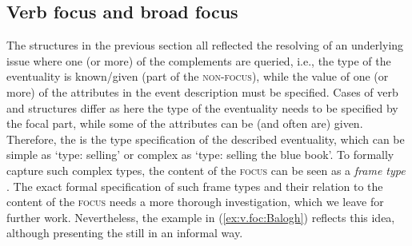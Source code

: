 \documentclass[output=paper,colorlinks,citecolor=brown]{langscibook}
\begin{document}
\subsection{Verb focus and broad focus }\label{sec:broad.foc:Balogh}

The  structures in the previous section all reflected the resolving of an underlying issue where one (or more) of the complements are queried, i.e., the type of the eventuality is known/given (part of the {\textsc{non-focus}}), while the value of one (or more) of the attributes in the event description must be specified. Cases of verb  and  structures differ as here the type of the eventuality needs to be specified by the focal part, while some of the attributes can be (and often are) given. Therefore, the  is the type specification of the described eventuality, which can be simple as `type: selling' or complex as `type: selling the blue book'. To formally capture such complex types, the content of the {\textsc{focus}} can be seen as a \textit{frame type} \citep[introduced by][]{balogh:osswald:20}. The exact formal specification of such frame types and their relation to the content of the {\textsc{focus}} needs a more thorough investigation, which we leave for further work. Nevertheless, the example in (\ref{ex:v.foc:Balogh}) reflects this idea, although presenting the  still in an informal way. 
\end{document}
